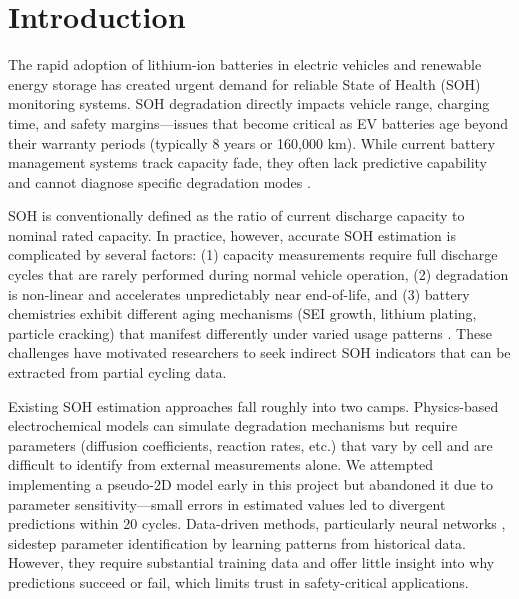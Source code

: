 \documentclass{sn-jnl}
\begin{document}

\maketitle

\section{Introduction}
\label{sec:intro}

The rapid adoption of lithium-ion batteries in electric vehicles and renewable energy storage has created urgent demand for reliable State of Health (SOH) monitoring systems. SOH degradation directly impacts vehicle range, charging time, and safety margins—issues that become critical as EV batteries age beyond their warranty periods (typically 8 years or 160,000 km). While current battery management systems track capacity fade, they often lack predictive capability and cannot diagnose specific degradation modes \citep{severson2019, zhao2021}.

SOH is conventionally defined as the ratio of current discharge capacity to nominal rated capacity. In practice, however, accurate SOH estimation is complicated by several factors: (1) capacity measurements require full discharge cycles that are rarely performed during normal vehicle operation, (2) degradation is non-linear and accelerates unpredictably near end-of-life, and (3) battery chemistries exhibit different aging mechanisms (SEI growth, lithium plating, particle cracking) that manifest differently under varied usage patterns \citep{zhang2018}. These challenges have motivated researchers to seek indirect SOH indicators that can be extracted from partial cycling data.

Existing SOH estimation approaches fall roughly into two camps. Physics-based electrochemical models \citep{han2014} can simulate degradation mechanisms but require parameters (diffusion coefficients, reaction rates, etc.) that vary by cell and are difficult to identify from external measurements alone. We attempted implementing a pseudo-2D model early in this project but abandoned it due to parameter sensitivity—small errors in estimated values led to divergent predictions within 20 cycles. Data-driven methods, particularly neural networks \citep{widodo2011}, sidestep parameter identification by learning patterns from historical data. However, they require substantial training data and offer little insight into why predictions succeed or fail, which limits trust in safety-critical applications.
\end{document}
